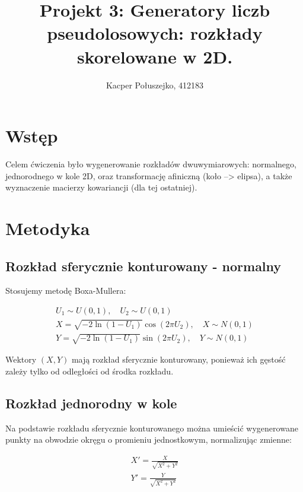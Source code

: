 \documentclass[a4paper,12pt,twoside]{article}
\title{\textbf{Projekt 3: Generatory liczb pseudolosowych: rozkłady skorelowane w 2D.}}
\author{Kacper Połuszejko, 412183}
\date{}
\begin{document}
\maketitle

\section*{Wstęp}

Celem ćwiczenia było wygenerowanie rozkładów dwuwymiarowych: normalnego, jednorodnego w kole 2D, oraz transformację afiniczną (koło --> elipsa), a także wyznaczenie macierzy kowariancji (dla tej ostatniej).

 \section{Metodyka}

 \subsection{Rozkład sferycznie konturowany - normalny}

 Stosujemy metodę Boxa-Mullera:

 
\begin{equation}
    \begin{gathered}
        U_1 \sim U(0,1), \quad U_2 \sim U(0,1) \\
        X = \sqrt{-2 \ln(1 - U_1)} \cos(2\pi U_2), \quad X \sim N(0,1) \\
        Y = \sqrt{-2 \ln(1 - U_1)} \sin(2\pi U_2), \quad Y \sim N(0,1)
    \end{gathered} \tag{1} \label{eq:1}
\end{equation}

 Wektory $(X,Y)$ mają rozkład sferycznie konturowany, ponieważ ich gęstość zależy tylko od odległości od środka rozkładu.

 \subsection{Rozkład jednorodny w kole}

 Na podstawie rozkładu sferycznie konturowanego można umieścić wygenerowane punkty na obwodzie okręgu o promieniu jednostkowym, normalizując zmienne:

\begin{equation}
    \begin{gathered}
    X' = \frac{X}{\sqrt{X^2 + Y^2}} \\
    Y' = \frac{Y}{\sqrt{X^2 + Y^2}}
    \end{gathered} \tag{2} \label{eq:2}
\end{equation}
\end{document}

